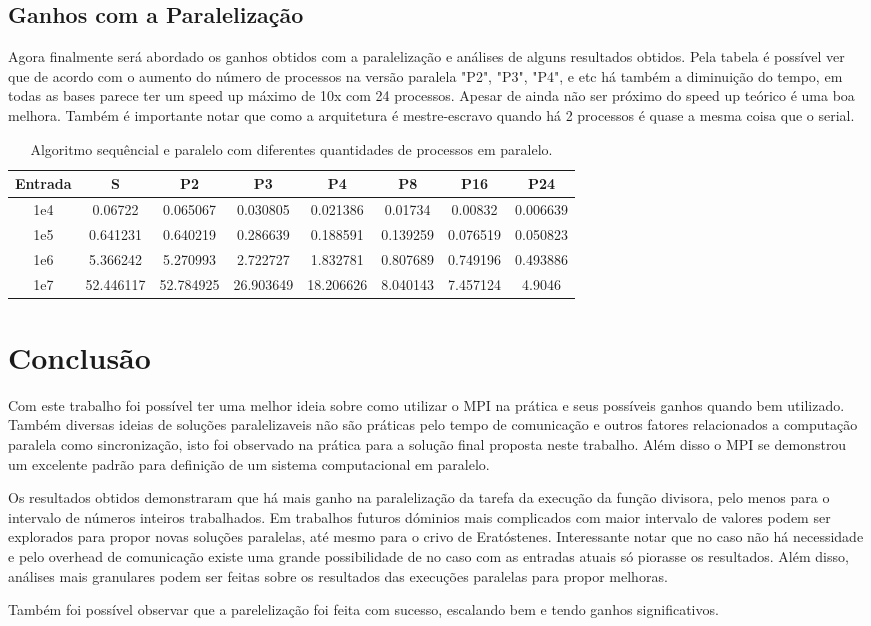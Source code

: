 \documentclass{article}
\begin{document}
\subsection{Ganhos com a Paralelização}

Agora finalmente será abordado os ganhos obtidos com a paralelização e análises de alguns resultados obtidos. Pela tabela é possível ver que de acordo com o aumento do número de processos na versão paralela "P2", "P3", "P4", e etc há também a diminuição do tempo, em todas as bases parece ter um speed up máximo de 10x com 24 processos. Apesar de ainda não ser próximo do speed up teórico é uma boa melhora. Também é importante notar que como a arquitetura é mestre-escravo quando há 2 processos é quase a mesma coisa que o serial.

\begin{table}[H]
  \tiny
  \begin{tabular}{|c|ccccccc|}
    \hline
    Entrada& S & P2 & P3 & P4 & P8 & P16 & P24\\
    \hline
    1e4 & 0.06722 & 0.065067 & 0.030805 & 0.021386 & 0.01734 & 0.00832 & 0.006639\\
    1e5 & 0.641231 & 0.640219 & 0.286639 & 0.188591 & 0.139259 & 0.076519 & 0.050823\\
    1e6 & 5.366242 & 5.270993 & 2.722727 & 1.832781 & 0.807689 & 0.749196 & 0.493886\\
    1e7 & 52.446117 & 52.784925 & 26.903649 & 18.206626 & 8.040143 & 7.457124 & 4.9046\\
    \hline
  \end{tabular}
  \caption{Algoritmo sequêncial e paralelo com diferentes quantidades de processos em paralelo.}
\end{table}


\section{Conclusão}

Com este trabalho foi possível ter uma melhor ideia sobre como utilizar o MPI na prática e seus possíveis ganhos quando bem utilizado. Também diversas ideias de soluções paralelizaveis não são práticas pelo tempo de comunicação e outros fatores relacionados a computação paralela como sincronização, isto foi observado na prática para a solução final proposta neste trabalho. Além disso o MPI se demonstrou um excelente padrão para definição de um sistema computacional em paralelo.

Os resultados obtidos demonstraram que há mais ganho na paralelização da tarefa da execução da função divisora, pelo menos para o intervalo de números inteiros trabalhados. Em trabalhos futuros dóminios mais complicados com maior intervalo de valores podem ser explorados para propor novas soluções paralelas, até mesmo para o crivo de Eratóstenes. Interessante notar que no caso não há necessidade e pelo overhead de comunicação existe uma grande possibilidade de no caso com as entradas atuais só piorasse os resultados. Além disso, análises mais granulares podem ser feitas sobre os  resultados das execuções paralelas para propor melhoras.

Também foi possível observar que a parelelização foi feita com sucesso, escalando bem e tendo ganhos significativos.

%
%
\end{document}
